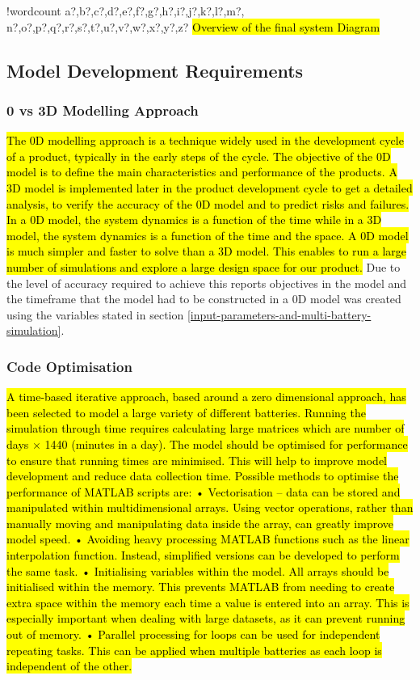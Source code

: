 \documentclass[fontsize=9.5pt]{extarticle}
\numberwithin{figure}{section} %
\newcounter{words}
\newenvironment{counted}{%
  \setcounter{words}{0}
  \SearchList!{wordcount}{\stepcounter{words}}
    {a?,b?,c?,d?,e?,f?,g?,h?,i?,j?,k?,l?,m?,
    n?,o?,p?,q?,r?,s?,t?,u?,v?,w?,x?,y?,z?}
  \UndoBoundary{'}
  \SearchOrder{p;}}{%
  \StopSearching}
\begin{document}
\begin{counted}
\hl{Overview of the final system Diagram}

\subsection{Model Development
Requirements}\label{model-development-requirements}

\subsubsection{0 vs 3D Modelling
Approach}\label{vs-3d-modelling-approach}

\hl{The 0D modelling approach is a technique widely used in the development cycle of a product, typically in the early steps of the cycle. The objective of the 0D model is to define the main characteristics and performance of the products. A 3D model is implemented later in the product development cycle to get a detailed analysis, to verify the accuracy of the 0D model and to predict risks and failures. In a 0D model, the system dynamics is a function of the time while in a 3D model, the system dynamics is a function of the time and the space. A 0D model is much simpler and faster to solve than a 3D model. This enables to run a large number of simulations and explore a large design space for our product.}
\autocite{ZeroDMod80:online} Due to the level of accuracy required to
achieve this reports objectives in the model and the timeframe that the
model had to be constructed in a 0D model was created using the
variables stated in section
\ref{input-parameters-and-multi-battery-simulation}.

\subsubsection{Code Optimisation}\label{code-optimisation}

\hl{A time-based iterative approach, based around a zero dimensional approach, has been selected to model a large variety of different batteries. Running the simulation through time requires calculating large matrices which are number of days $\times$ 1440 (minutes in a day). The model should be optimised for performance to ensure that running times are minimised. This will help to improve model development and reduce data collection time. Possible methods to optimise the performance of MATLAB scripts are:
• Vectorisation – data can be stored and manipulated within multidimensional arrays. Using vector operations, rather than manually moving and manipulating data inside the array, can greatly improve model speed.
• Avoiding heavy processing MATLAB functions such as the linear interpolation function. Instead, simplified versions can be developed to perform the same task.
• Initialising variables within the model. All arrays should be initialised within the memory. This prevents MATLAB from needing to create extra space within the memory each time a value is entered into an array. This is especially important when dealing with large datasets, as it can prevent running out of memory.
• Parallel processing for loops can be used for independent repeating tasks. This can be applied when multiple batteries as each loop is independent of the other.}


\end{counted}
\end{document}
